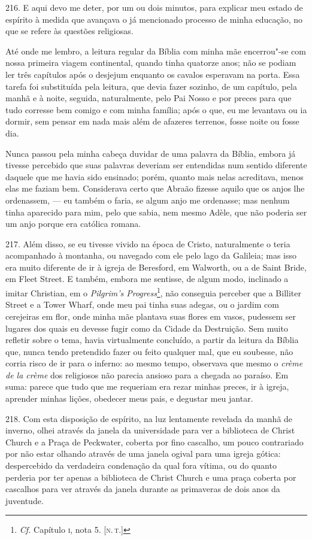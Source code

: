 216. E aqui devo me deter, por um ou dois minutos, para explicar meu
estado de espírito à medida que avançava o já mencionado processo de
minha educação, no que se refere às questões religiosas.

Até onde me lembro, a leitura regular da Bíblia com minha mãe
encerrou"-se com nossa primeira viagem continental, quando tinha quatorze
anos; não se podiam ler três capítulos após o desjejum enquanto os
cavalos esperavam na porta. Essa tarefa foi substituída pela leitura,
que devia fazer sozinho, de um capítulo, pela manhã e à noite, seguida,
naturalmente, pelo Pai Nosso e por preces para que tudo corresse bem
comigo e com minha família; após o que, eu me levantava ou ia dormir,
sem pensar em nada mais além de afazeres terrenos, fosse noite ou fosse
dia.

Nunca passou pela minha cabeça duvidar de uma palavra da Bíblia, embora
já tivesse percebido que suas palavras deveriam ser entendidas num
sentido diferente daquele que me havia sido ensinado; porém, quanto mais
nelas acreditava, menos elas me faziam bem. Considerava certo que Abraão
fizesse aquilo que os anjos lhe ordenassem, --- eu também o faria, se
algum anjo me ordenasse; mas nenhum tinha aparecido para mim, pelo que
sabia, nem mesmo Adèle, que não poderia ser um anjo porque era católica
romana.

217. Além disso, se eu tivesse vivido na época de Cristo, naturalmente o
teria acompanhado à montanha, ou navegado com ele pelo lago da Galileia;
mas isso era muito diferente de ir à igreja de Beresford, em Walworth,
ou a de Saint Bride, em Fleet Street. E também, embora me sentisse, de
algum modo, inclinado a imitar Christian, em o \emph{Pilgrim's
Progress}\footnote{\emph{Cf.} Capítulo \textsc{i}, nota 5. {[}\textsc{n.\,t.}{]}}, não
conseguia perceber que a Billiter Street e a Tower Wharf, onde meu pai
tinha suas adegas, ou o jardim com cerejeiras em flor, onde minha mãe
plantava suas flores em vasos, pudessem ser lugares dos quais eu devesse
fugir como da Cidade da Destruição. Sem muito refletir sobre o tema,
havia virtualmente concluído, a partir da leitura da Bíblia que, nunca
tendo pretendido fazer ou feito qualquer mal, que eu soubesse, não
corria risco de ir para o inferno: ao mesmo tempo, observava que mesmo o
\emph{crème de la crème} dos religiosos não parecia ansioso para a
chegada ao paraíso. Em suma: parece que tudo que me requeriam era rezar
minhas preces, ir à igreja, aprender minhas lições, obedecer meus pais,
e degustar meu jantar.

218. Com esta disposição de espírito, na luz lentamente revelada da
manhã de inverno, olhei através da janela da universidade para ver a
biblioteca de Christ Church e a Praça de Peckwater, coberta por fino
cascalho, um pouco contrariado por não estar olhando através de uma
janela ogival para uma igreja gótica: despercebido da verdadeira
condenação da qual fora vítima, ou do quanto perderia por ter apenas a
biblioteca de Christ Church e uma praça coberta por cascalhos para ver
através da janela durante as primaveras de dois anos da juventude.

